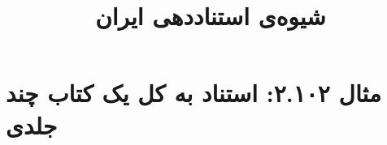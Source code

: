 \documentclass[a4paper,10pt]{article}
\begin{document}
\title{شیوه‌ی استناددهی ایران
 }
\author{}
\date{}
\maketitle



\section*{مثال ۲.۱۰۲: استناد به کل یک کتاب چند جلدی}

\cite{اسمیت1966}\\
\cite{wright1968}\\






\end{document}
